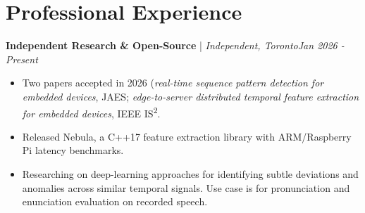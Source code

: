\documentclass[11pt]{article}
\newenvironment{cvrole}[5]{%
  \par\noindent\textbf{\large #1} | \textit{\small #2, #3}\hfill \textit{\small #4 - #5}\par
  \begin{itemize}[leftmargin=2em, itemsep=-0.3em, topsep=-0.5em]%
}{%
  \end{itemize}\par\noindent\mbox{}\par\vspace{0.1em}%
}
\begin{document}
\section*{Professional Experience}
 
\begin{cvrole}{Independent Research \& Open-Source}{Independent}{Toronto}{Jan 2026}{Present}


    \item Two papers accepted in 2026 (\textit{real-time sequence pattern detection for embedded devices}, JAES; \textit{edge-to-server distributed temporal feature extraction for embedded devices}, IEEE IS\textsuperscript{2}.
    \item Released {Nebula}, a C++17 feature extraction library with ARM/Raspberry Pi latency benchmarks.
    \item Researching on deep-learning approaches for identifying subtle deviations and anomalies across similar temporal signals. Use case is for pronunciation and enunciation evaluation on recorded speech.
\end{cvrole}
 
\end{document}
